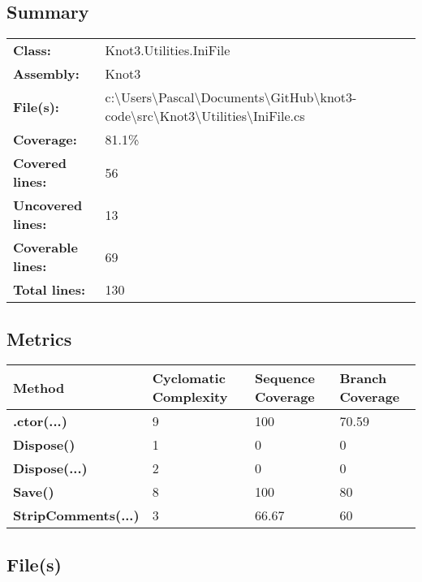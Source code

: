 \documentclass[a4paper,10pt]{article}
\begin{document}
\subsection{Summary}
\begin{longtable}[l]{ll}
\textbf{Class:} & Knot3.Utilities.IniFile\\
\textbf{Assembly:} & Knot3\\
\textbf{File(s):} & \begin{minipage}[t]{12cm}{c:\textbackslash Users\textbackslash Pascal\textbackslash Documents\textbackslash GitHub\textbackslash knot3-code\textbackslash src\textbackslash Knot3\textbackslash Utilities\textbackslash IniFile.cs}\end{minipage} \\
\textbf{Coverage:} & 81.1\%\\
\textbf{Covered lines:} & 56\\
\textbf{Uncovered lines:} & 13\\
\textbf{Coverable lines:} & 69\\
\textbf{Total lines:} & 130\\
\end{longtable}
\subsection{Metrics}
\begin{longtable}[l]{|l|l|l|l|}
\hline
\textbf{Method} & \textbf{Cyclomatic Complexity} & \textbf{Sequence Coverage} & \textbf{Branch Coverage}\\
\hline
\textbf{.ctor(...)} & 9 & 100 & 70.59\\
\hline
\textbf{Dispose()} & 1 & 0 & 0\\
\hline
\textbf{Dispose(...)} & 2 & 0 & 0\\
\hline
\textbf{Save()} & 8 & 100 & 80\\
\hline
\textbf{StripComments(...)} & 3 & 66.67 & 60\\
\hline
\end{longtable}
\subsection{File(s)}
\end{document}
